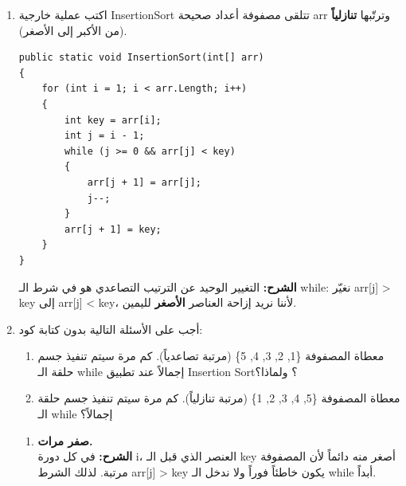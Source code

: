 \documentclass[14pt]{extarticle}
\begin{document}
\begin{enumerate}[itemsep=2em]
\item
اكتب عملية خارجية \textenglish{InsertionSort} تتلقى مصفوفة أعداد صحيحة \textenglish{arr} وترتّبها \textbf{تنازلياً} (من الأكبر إلى الأصغر).

\ifwithsols
\begin{boxSolution}
\begin{english}
\begin{boxCode}
\begin{verbatim}
public static void InsertionSort(int[] arr)
{
    for (int i = 1; i < arr.Length; i++)
    {
        int key = arr[i];
        int j = i - 1;
        while (j >= 0 && arr[j] < key)
        {
            arr[j + 1] = arr[j];
            j--;
        }
        arr[j + 1] = key;
    }
}
\end{verbatim}
\end{boxCode}
\end{english}
\textbf{الشرح:} التغيير الوحيد عن الترتيب التصاعدي هو في شرط الـ \textenglish{while}: نغيّر \textenglish{arr[j] > key} إلى \textenglish{arr[j] < key}، لأننا نريد إزاحة العناصر \textbf{الأصغر} لليمين.
\end{boxSolution}
\clearpage
\fi

\item
أجب على الأسئلة التالية بدون كتابة كود:

\begin{enumerate}[itemsep=10pt]
    \item معطاة المصفوفة \textenglish{\{1, 2, 3, 4, 5\}} (مرتبة تصاعدياً). كم مرة سيتم تنفيذ جسم حلقة الـ \textenglish{while} إجمالاً عند تطبيق \textenglish{Insertion Sort}؟ ولماذا؟
    \item معطاة المصفوفة \textenglish{\{5, 4, 3, 2, 1\}} (مرتبة تنازلياً). كم مرة سيتم تنفيذ جسم حلقة الـ \textenglish{while} إجمالاً؟
\end{enumerate}

\ifwithsols
\begin{boxSolution}
\begin{enumerate}[itemsep=6pt]
    \item \textbf{صفر مرات.} \\
    \textbf{الشرح:} في كل دورة \textenglish{i}، العنصر الذي قبل الـ \textenglish{key} أصغر منه دائماً لأن المصفوفة مرتبة. لذلك الشرط \textenglish{arr[j] > key} يكون خاطئاً فوراً ولا ندخل الـ \textenglish{while} أبداً.


\end{enumerate}
\end{boxSolution}
\end{enumerate}
\end{document}
